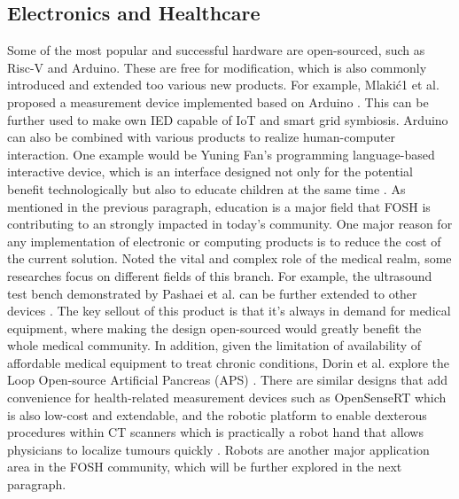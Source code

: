 \documentclass[final-report.tex]{subfiles}
\begin{document}
\subsection{Electronics and Healthcare}
Some of the most popular and successful hardware are open-sourced, such as Risc-V and Arduino. 
These are free for modification, which is also commonly introduced and extended too various new products. 
For example, Mlakić1 et al. proposed a measurement device implemented based on Arduino \cite{mlakic2019open}. This can be further used to make own IED capable of IoT and smart grid symbiosis. Arduino can also be combined with various products to realize human-computer interaction. 
One example would be Yuning Fan's programming language-based interactive device, which is an interface designed not only for the potential benefit technologically but also to educate children at the same time \cite{fan2021open}.
As mentioned in the previous paragraph, education is a major field that FOSH is contributing to an strongly impacted in today's community.  
One major reason for any implementation of electronic or computing products is to reduce the cost of the current solution. Noted the vital and complex role of the medical realm, some researches  focus on different fields of this branch. 
For example, the ultrasound test bench demonstrated by Pashaei et al. can be further extended to other devices \cite{pashaei2018live}. 
The key sellout of this product is that it's always in demand for medical equipment, where making the design open-sourced would greatly benefit the whole medical community. 
In addition, given the limitation of availability of affordable medical equipment to treat chronic conditions, Dorin et al. explore the Loop Open-source Artificial Pancreas (APS) \cite{dorin2020open}.
There are similar designs that add convenience for health-related measurement devices such as OpenSenseRT which is also low-cost and extendable, and the robotic platform to enable dexterous procedures within CT scanners which is practically a robot hand that allows physicians to localize tumours quickly \cite{slade2021open}. Robots are another major application area in the FOSH community, which will be further explored in the next paragraph. 
\end{document}
